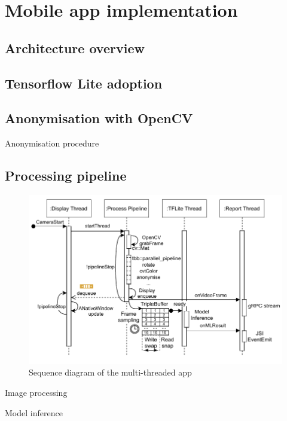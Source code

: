 \section{Mobile app implementation}
\label{sec:Mobile app implementation}

\subsection{Architecture overview}

\subsection{Tensorflow Lite adoption}

\subsection{Anonymisation with OpenCV} %

\begin{algorithm}[!ht]

\caption{Anonymisation procedure}
\label{algo:Anonymisation procedure}
\end{algorithm}

\subsection{Processing pipeline}

\begin{figure}[!ht]
    \centering
    \includegraphics[width=\textwidth]{implementation/imgs/4-model-infer.pdf}
    \caption{Sequence diagram of the multi-threaded app}
    \label{fig:4-model-infer}
\end{figure}
\begin{minipage}{.5\textwidth}
\begin{algorithm}[H]

\caption{Image processing}
\label{algo:Image processing}
\end{algorithm}
\end{minipage}
\vline
\begin{minipage}{.5\textwidth}
\begin{algorithm}[H]

\caption{Model inference}
\label{algo:Model inference}
\end{algorithm}
\end{minipage}

